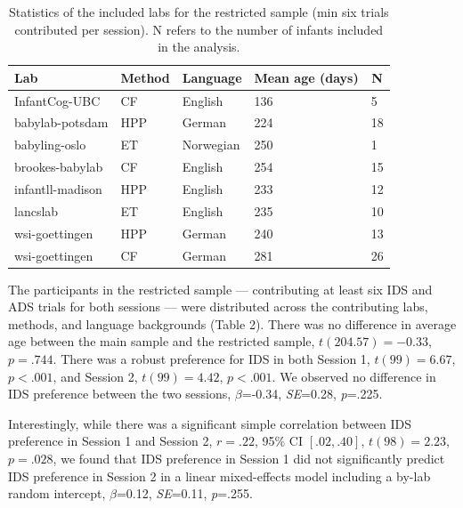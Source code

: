 \documentclass[
  english,
  man, donotrepeattitle,floatsintext]{apa6}
\begin{document}
\begin{table}[tbp]

\begin{center}
\begin{threeparttable}

\caption{\label{tab:labs6}Statistics of the included labs for the restricted sample (min six trials contributed per session). N refers to the number of infants included in the analysis.}

\begin{tabular}{lllll}
\toprule
Lab & \multicolumn{1}{c}{Method} & \multicolumn{1}{c}{Language} & \multicolumn{1}{c}{Mean age (days)} & \multicolumn{1}{c}{N}\\
\midrule
InfantCog-UBC & CF & English & 136 & 5\\
babylab-potsdam & HPP & German & 224 & 18\\
babyling-oslo & ET & Norwegian & 250 & 1\\
brookes-babylab & CF & English & 254 & 15\\
infantll-madison & HPP & English & 233 & 12\\
lancslab & ET & English & 235 & 10\\
wsi-goettingen & HPP & German & 240 & 13\\
wsi-goettingen & CF & German & 281 & 26\\
\bottomrule
\end{tabular}

\end{threeparttable}
\end{center}

\end{table}

The participants in the restricted sample --- contributing at least six IDS and ADS trials for both sessions --- were distributed across the contributing labs, methods, and language backgrounds (Table 2). There was no difference in average age between the main sample and the restricted sample, \(t(204.57) = -0.33\), \(p = .744\). There was a robust preference for IDS in both Session 1, \(t(99) = 6.67\), \(p < .001\), and Session 2, \(t(99) = 4.42\), \(p < .001\). We observed no difference in IDS preference between the two sessions, \(\beta\)=-0.34, \emph{SE}=0.28, \emph{p}=.225.

Interestingly, while there was a significant simple correlation between IDS preference in Session 1 and Session 2, \(r = .22\), 95\% CI \([.02, .40]\), \(t(98) = 2.23\), \(p = .028\), we found that IDS preference in Session 1 did not significantly predict IDS preference in Session 2 in a linear mixed-effects model including a by-lab random intercept, \(\beta\)=0.12, \emph{SE}=0.11, \emph{p}=.255.
\end{document}
